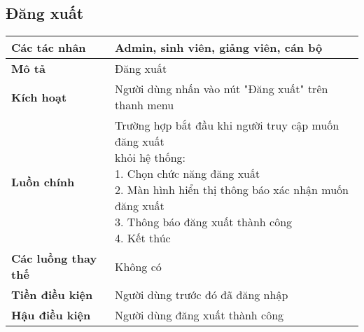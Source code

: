 \subsection*{Đăng xuất}
	\begin{tabular}{|l|p{}|}
		\hline
		\textbf{Các tác nhân}         & Admin, sinh viên, giảng viên, cán bộ                              \\
		\hline
		\textbf{Mô tả}                & Đăng xuất                                                                        \\
		\hline
		\textbf{Kích hoạt}            & Người dùng nhấn vào nút "Đăng xuất" trên thanh menu                              \\
		\hline
		\textbf{Luồn chính}           & \makecell[l]{Trường hợp bắt đầu khi người truy cập muốn đăng xuất \\ khỏi hệ thống: \\ 1. Chọn chức năng đăng xuất \\ 2. Màn hình hiển thị thông báo xác nhận muốn đăng xuất \\ 3. Thông báo đăng xuất thành công \\ 4. Kết thúc} \\
		\hline
		\textbf{Các luồng thay thế}   & Không có                                                                         \\
		\hline
		\textbf{Tiền điều kiện}       & Người dùng trước đó đã đăng nhập                                                 \\
		\hline
		\textbf{Hậu điều kiện}        & Người dùng đăng xuất thành công                                                  \\
		\hline
	\end{tabular}

